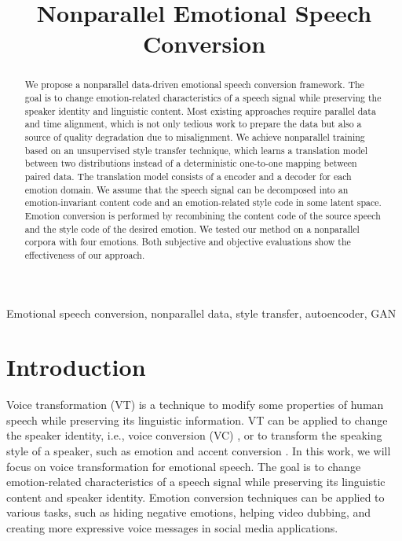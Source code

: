 \documentclass{article}
\title{Nonparallel Emotional Speech Conversion}
\begin{document}
%
\maketitle
%
\begin{abstract}
We propose a nonparallel data-driven emotional speech conversion framework. The goal is to change emotion-related characteristics of a speech signal while preserving the speaker identity and linguistic content. Most existing approaches require parallel data and time alignment, which is not only tedious work to prepare the data but also a source of quality degradation due to misalignment. We achieve nonparallel training based on an unsupervised style transfer technique, which learns a translation model between two distributions instead of a deterministic one-to-one mapping between paired data. The translation model consists of a encoder and a decoder for each emotion domain. We assume that the speech signal can be decomposed into an emotion-invariant content code and an emotion-related style code in some latent space. Emotion conversion is performed by recombining the content code of the source speech and the style code of the desired emotion. We tested our method on a nonparallel corpora with four emotions. Both subjective and objective evaluations show the effectiveness of our approach.
\end{abstract}

%
\begin{keywords}
Emotional speech conversion, nonparallel data, style transfer, autoencoder, GAN
\end{keywords}
%



\section{Introduction}
\label{sec:intro}
Voice transformation (VT) is a technique to modify some properties of human speech while preserving its linguistic information. VT can be applied to change the speaker identity, i.e., voice conversion (VC) \cite{mohammadi2017overview}, or to transform the speaking style of a speaker, such as emotion and accent conversion \cite{zhao2018accent}. In this work, we will focus on voice transformation for emotional speech. The goal is to change emotion-related characteristics of a speech signal while preserving its linguistic content and speaker identity. Emotion conversion techniques can be applied to various tasks, such as hiding negative emotions, helping video dubbing, and creating more expressive voice messages in social media applications.
\end{document}
